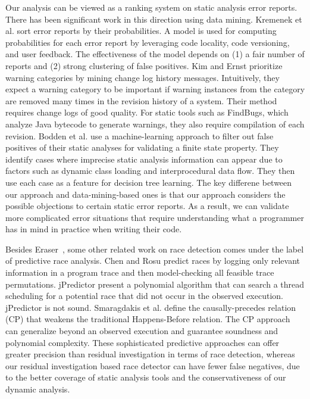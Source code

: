 Our analysis can be viewed as a ranking system on static analysis
error reports.  There has been significant work in this direction using data mining.
Kremenek et al. \cite{kremenek2004} sort error reports by their probabilities.  A
model is used for computing probabilities for each error report by
leveraging code locality, code versioning, and user feedback.  The
effectiveness of the model depends on (1) a fair number of reports and
(2) strong clustering of false positives.  Kim and Ernst \cite{kim2007} prioritize
warning categories by mining change log history messages.
Intuitively, they expect a warning category to be important if warning
instances from the category are removed many times in the revision
history of a system. Their method requires change logs of good
quality. For static tools such as FindBugs, which analyze Java
bytecode to generate warnings, they also require compilation of each
revision. Bodden et al. \cite{Bodden2008FPE} use a machine-learning approach to filter out false positives of their static analyses for validating a finite state property.  They identify cases where imprecise static analysis information can appear due to factors such as dynamic class loading and interprocedural data flow.  They then use each case as a feature for decision tree learning.  The key differene between our approach and data-mining-based ones is that our approach considers the possible objections to certain static error reports.  As a result, we can validate more complicated error situations that require understanding what a programmer has in mind in practice when writing their code. 

Besides Eraser~\cite{266641}, some other related work on race detection comes under the label of predictive race analysis.  
Chen and Rosu \cite{Chen:2007:PSC:1770351.1770387} predict races by logging only relevant information in a program trace and then model-checking all feasible trace permutations.   jPredictor \cite{Chen:2008:JPR:1368088.1368119} present a polynomial algorithm that can search a thread scheduling for a potential race that did not occur in the observed execution. jPredictor is not sound.  Smaragdakis et al. \cite{Smaragdakis:2012:SPR:2103656.2103702} define the causally-precedes relation (CP) that weakens the traditional Happens-Before relation.  The CP approach can generalize beyond an observed execution and guarantee soundness and polynomial complexity. These sophisticated predictive approaches can offer greater precision than residual investigation in terms of race detection, whereas our residual investigation based race detector can have fewer false negatives, due to the better coverage of static analysis tools and the conservativeness of our dynamic analysis.

